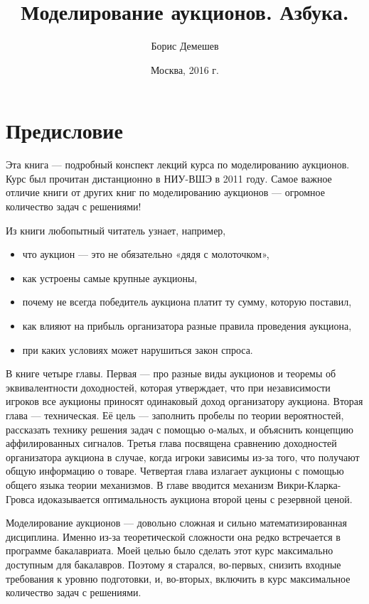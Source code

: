 \documentclass[11pt, openany]{book}
\title{Моделирование аукционов. Азбука. }
\author{Борис Демешев}
\date{Москва, 2016 г.}
\numberwithin{equation}{page} %
\theoremstyle{definition} %
\theoremstyle{definition}
\theoremstyle{definition}
\begin{document}
\maketitle
\tableofcontents{}

\chapter*{Предисловие}

Эта книга — подробный конспект лекций курса по моделированию аукционов. Курс был прочитан дистанционно в НИУ-ВШЭ в 2011 году. Самое важное отличие книги от других книг по моделированию аукционов — огромное количество задач с решениями!

Из книги любопытный читатель узнает, например,
\begin{itemize}
\item что аукцион — это не обязательно «дядя с молоточком»,
\item как устроены самые крупные аукционы,
\item почему не всегда победитель аукциона платит ту сумму, которую поставил,
\item как влияют на прибыль организатора разные правила проведения аукциона,
\item при каких условиях может нарушиться закон спроса.
\end{itemize}

В книге четыре главы. Первая — про разные виды аукционов и теоремы об эквивалентности доходностей, которая утверждает, что при независимости игроков все аукционы приносят одинаковый доход организатору аукциона. Вторая глава — техническая. Её цель — заполнить пробелы по теории вероятностей, рассказать технику решения задач с помощью о-малых, и объяснить концепцию аффилированных сигналов. Третья глава посвящена сравнению доходностей организатора аукциона в случае, когда игроки зависимы из-за того, что получают общую информацию о товаре. Четвертая глава излагает аукционы с помощью общего языка теории механизмов. В главе вводится механизм Викри-Кларка-Гровса идоказывается оптимальность аукциона второй цены с резервной ценой.

Моделирование аукционов — довольно сложная и сильно математизированная дисциплина. Именно из-за теоретической сложности она редко встречается в программе бакалавриата. Моей целью было сделать этот курс максимально доступным для бакалавров. Поэтому я старался, во-первых, снизить входные требования к уровню подготовки, и, во-вторых, включить в курс максимальное количество задач с решениями.
\end{document}
